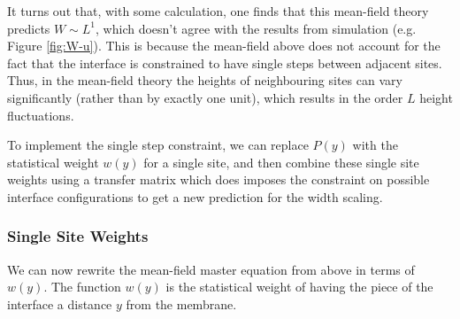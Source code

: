 \documentclass[a4paper,10pt]{article}
\newcommand{\fref}[1]{Figure \ref{#1}}
\begin{document}
It turns out that, with some calculation, one finds that this mean-field theory predicts $W \sim L^1$, which doesn't agree with the results from simulation (e.g. \fref{fig:W-u}). This is because the mean-field above does not account for the fact that the interface is constrained to have single steps between adjacent sites. Thus, in the mean-field theory the heights of neighbouring sites can vary significantly (rather than by exactly one unit), which results in the order $L$ height fluctuations.

To implement the single step constraint, we can replace $P(y)$ with the statistical weight $w(y)$ for a single site, and then combine these single site weights using a transfer matrix which does imposes the constraint on possible interface configurations to get a new prediction for the width scaling.

\subsubsection{Single Site Weights}

We can now rewrite the mean-field master equation from above in terms of $w(y)$. The function $w(y)$ is the statistical weight of having the piece of the interface a distance $y$ from the membrane.
\end{document}
